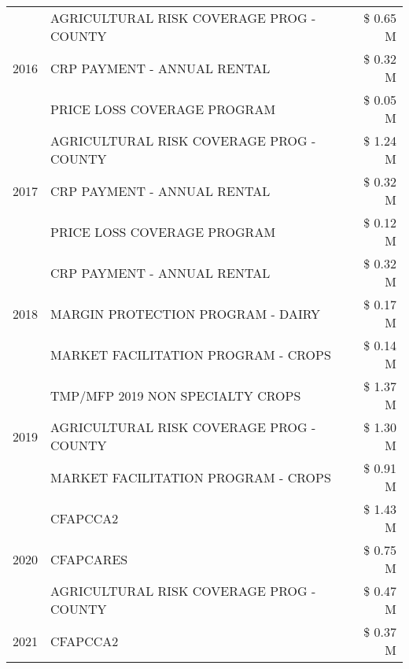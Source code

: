 \begin{tabular}{llr}
\cline{1-3}
\multirow[t]{3}{*}{2016} & AGRICULTURAL RISK COVERAGE PROG - COUNTY & \$ 0.65 M \\
 & CRP PAYMENT - ANNUAL RENTAL & \$ 0.32 M \\
 & PRICE LOSS COVERAGE PROGRAM & \$ 0.05 M \\
\cline{1-3}
\multirow[t]{3}{*}{2017} & AGRICULTURAL RISK COVERAGE PROG - COUNTY & \$ 1.24 M \\
 & CRP PAYMENT - ANNUAL RENTAL & \$ 0.32 M \\
 & PRICE LOSS COVERAGE PROGRAM & \$ 0.12 M \\
\cline{1-3}
\multirow[t]{3}{*}{2018} & CRP PAYMENT - ANNUAL RENTAL & \$ 0.32 M \\
 & MARGIN PROTECTION PROGRAM - DAIRY & \$ 0.17 M \\
 & MARKET FACILITATION PROGRAM - CROPS & \$ 0.14 M \\
\cline{1-3}
\multirow[t]{3}{*}{2019} & TMP/MFP 2019 NON SPECIALTY CROPS & \$ 1.37 M \\
 & AGRICULTURAL RISK COVERAGE PROG - COUNTY & \$ 1.30 M \\
 & MARKET FACILITATION PROGRAM - CROPS & \$ 0.91 M \\
\cline{1-3}
\multirow[t]{3}{*}{2020} & CFAPCCA2 & \$ 1.43 M \\
 & CFAPCARES & \$ 0.75 M \\
 & AGRICULTURAL RISK COVERAGE PROG - COUNTY & \$ 0.47 M \\
\cline{1-3}
2021 & CFAPCCA2 & \$ 0.37 M \\
\cline{1-3}
\bottomrule
\end{tabular}
